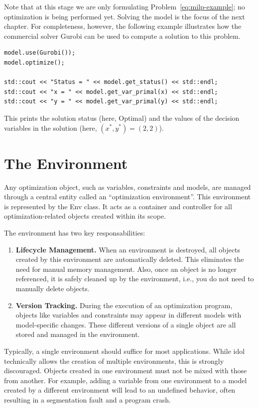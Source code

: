 Note that at this stage we are only formulating
Problem~\eqref{eq:milp-example}; no optimization is being performed yet.
Solving the model is the focus of the next chapter. For completeness, however,
the following example illustrates how the commercial solver \textsf{Gurobi}
can be used to compute a solution to this problem.
%
\begin{lstlisting}
model.use(Gurobi());
model.optimize();

std::cout << "Status = " << model.get_status() << std::endl;
std::cout << "x = " << model.get_var_primal(x) << std::endl;
std::cout << "y = " << model.get_var_primal(y) << std::endl;
\end{lstlisting}

This prints the solution status (here, \textsf{Optimal}) and the values of the
decision variables in the solution (here, $(x^*,y^*) = (2,2)$). 

\section{The Environment}

Any optimization object, such as variables, constraints and models, are
managed through a central entity called an ``optimization environment''. This
environment is represented by the \textsf{Env} class. It acts as a container
and controller for all optimization-related objects created within its scope.

The environment has two key responsabilities:
\begin{enumerate}
    \item \textbf{Lifecycle Management.} When an environment is destroyed, all
    objects created by this environment are automatically deleted. This
    eliminates the need for manual memory management. Also, once an object is
    no longer referenced, it is safely cleaned up by the environment, i.e.,
    you do not need to manually delete objects.
    \item \textbf{Version Tracking.} During the execution of an optimization
    program, objects like variables and constraints may appear in different
    models with model-specific changes. These different versions of a single
    object are all stored and managed in the environment.  
\end{enumerate}

Typically, a single environment should suffice for most applications. While
\textsf{idol} technically allows the creation of multiple environments, this
is strongly discouraged. Objects created in one environment must not be mixed
with those from another. For example, adding a variable from one environment
to a model created by a different environment will lead to an undefined
behavior, often resulting in a segmentation fault and a program crash.

